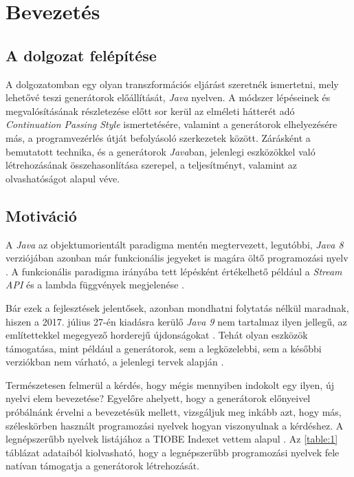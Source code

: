 \chapter{Bevezetés}

\section{A dolgozat felépítése}

A dolgozatomban egy olyan transzformációs eljárást szeretnék ismertetni, mely lehetővé teszi generátorok előállítását, \textit{Java} nyelven. A módszer lépéseinek és megvalósításának részletezése előtt sor kerül az elméleti hátterét adó \textit{Continuation Passing Style} ismertetésére, valamint a generátorok elhelyezésére más, a programvezérlés útját befolyásoló szerkezetek között. Zárásként a bemutatott technika, és a generátorok \textit{Java}ban, jelenlegi eszközökkel való létrehozásának összehasonlítása szerepel, a teljesítményt, valamint az olvashatóságot alapul véve.

\section{Motiváció}

A \textit{Java} az objektumorientált paradigma mentén megtervezett, legutóbbi, \textit{Java 8} verziójában azonban már funkcionális jegyeket is magára öltő programozási nyelv . A funkcionális paradigma irányába tett lépésként értékelhető például a \textit{Stream API} és a lambda függvények megjelenése \cite{Java8Features}. 

Bár ezek a fejlesztések jelentősek, azonban mondhatni folytatás nélkül maradnak, hiszen a 2017. július 27-én kiadásra kerülő \textit{Java 9} nem tartalmaz ilyen jellegű, az említettekkel megegyező horderejű újdonságokat \cite{Java9Features}. Tehát olyan eszközök támogatása, mint például a generátorok, sem a legközelebbi, sem a későbbi verziókban nem várható, a jelenlegi tervek alapján \cite{ProjectValhalla}.

Természetesen felmerül a kérdés, hogy mégis mennyiben indokolt egy ilyen, új nyelvi elem bevezetése? Egyelőre ahelyett, hogy a generátorok előnyeivel próbálnánk érvelni a bevezetésük mellett, vizsgáljuk meg inkább azt, hogy más, széleskörben használt programozási nyelvek hogyan viszonyulnak a kérdéshez. A legnépszerűbb nyelvek listájához a TIOBE Indexet vettem alapul \cite{TIOBEIndex}. Az \ref{table:1} táblázat adataiból kiolvasható, hogy a legnépszerűbb programozási nyelvek fele natívan támogatja a generátorok létrehozását.

